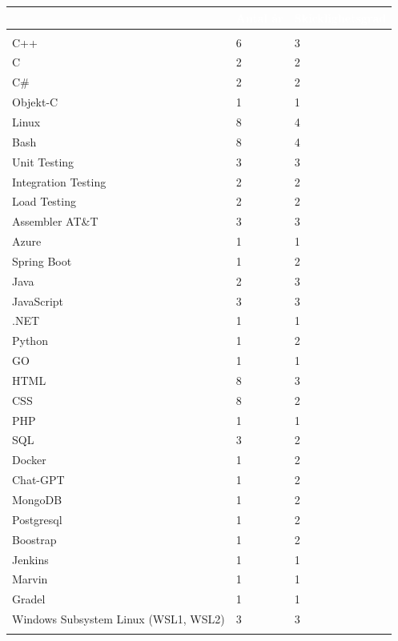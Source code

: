 \documentclass{article}
\begin{document}
\begin{tabular}{|l|l|l|}
\hline
\rowcolor{colorBlue}
\multicolumn{1}{|l|}{\textcolor{white}{\textbf{Kompetens}}} & \multicolumn{1}{l|}{\textcolor{white}{\textbf{Antal år}}} & \multicolumn{1}{l|}{\textcolor{white}{\textbf{Skicklighetsgrad}}} \\
\hline
\rowcolor{colorBlueTwo}
\multicolumn{3}{|l|}{\textcolor{white}{\textbf{Teknisk kunskap}}} \\
\hline
C++ & 6 & 3 \\
\hline
C & 2 & 2 \\
\hline
C\# & 2 & 2 \\
\hline
Objekt-C & 1 & 1 \\
\hline
Linux & 8 & 4 \\
\hline
Bash & 8 & 4 \\
\hline
Unit Testing & 3 & 3 \\
\hline
Integration Testing & 2 & 2 \\
\hline
Load Testing & 2 & 2 \\
\hline
Assembler AT\&T & 3 & 3 \\
\hline
Azure & 1 & 1 \\
\hline
Spring Boot & 1 & 2 \\
\hline
Java & 2 & 3 \\
\hline
JavaScript & 3 & 3 \\
\hline
.NET & 1 & 1 \\
\hline
Python & 1 & 2 \\
\hline
GO & 1 & 1 \\
\hline
HTML & 8 & 3 \\
\hline
CSS & 8 & 2 \\
\hline
PHP & 1 & 1 \\
\hline
SQL & 3 & 2 \\
\hline
Docker & 1 & 2 \\
\hline
Chat-GPT & 1 & 2 \\
\hline
MongoDB & 1 & 2 \\
\hline
Postgresql&1 & 2 \\
\hline
Boostrap & 1 & 2 \\
\hline
Jenkins & 1 & 1 \\
\hline
Marvin & 1 & 1 \\
\hline
Gradel & 1 & 1 \\
\hline
Windows Subsystem Linux (WSL1, WSL2) & 3 & 3 \\
\hline
\rowcolor{colorBlueTwo}
\multicolumn{3}{|l|}{\textcolor{white}{\textbf{Applikationskunskap}}} \\

\end{tabular}
\end{document}
